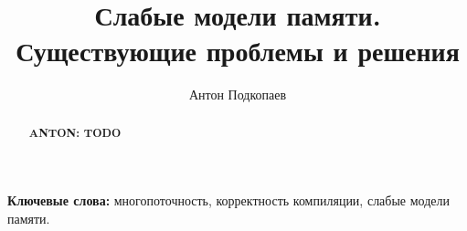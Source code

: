 \documentclass[12pt]{article}
\title{Слабые модели памяти.\\ Существующие проблемы и решения}
\author{Антон Подкопаев}
\affil{СПбГУ, JetBrains Research, Россия}
\theoremstyle{plain}
\newcommand{\app}[1]{{\color{blue}\textbf{ANTON: #1}}}
\begin{document}
\maketitle

\begin{abstract}
  \app{TODO}
\end{abstract}

{\bf Ключевые слова:} многопоточность, корректность компиляции, слабые модели памяти.


\newpage



\end{document}
